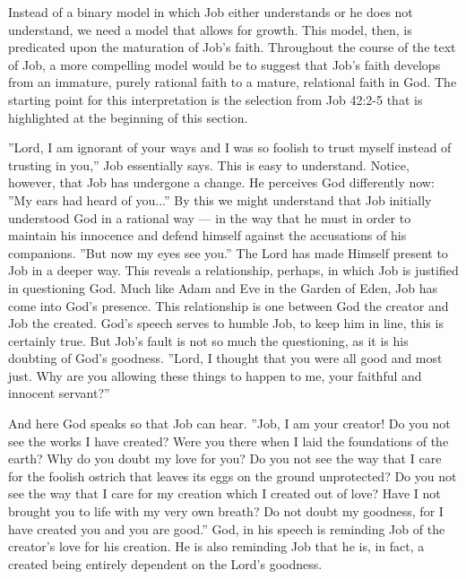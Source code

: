Instead of a binary model in which Job either understands or he does not understand, we need a model that allows for growth. This model, then, is predicated upon the maturation of Job's faith. Throughout the course of the text of Job, a more compelling model would be to suggest that Job's faith develops from an immature, purely rational faith to a mature, relational faith in God. The starting point for this interpretation is the selection from Job 42:2-5 that is highlighted at the beginning of this section.

''Lord, I am ignorant of your ways and I was so foolish to trust myself instead of trusting in you,'' Job essentially says. This is easy to understand. Notice, however, that Job has undergone a change. He perceives God differently now: ''My ears had heard of you...'' By this we might understand that Job initially understood God in a rational way --- in the way that he must in order to maintain his innocence and defend himself against the accusations of his companions. ''But now my eyes see you.'' The Lord has made Himself present to Job in a deeper way. This reveals a relationship, perhaps, in which Job is justified in questioning God. Much like Adam and Eve in the Garden of Eden, Job has come into God's presence. This relationship is one between God the creator and Job the created. God's speech serves to humble Job, to keep him in line, this is certainly true. But Job's fault is not so much the questioning, as it is his doubting of God's goodness. ''Lord, I thought that you were all good and most just. Why are you allowing these things to happen to me, your faithful and innocent servant?''

And here God speaks so that Job can hear. ''Job, I am your creator! Do you not see the works I have created? Were you there when I laid the foundations of the earth? Why do you doubt my love for you? Do you not see the way that I care for the foolish ostrich that leaves its eggs on the ground unprotected? Do you not see the way that I care for my creation which I created out of love? Have I not brought you to life with my very own breath? Do not doubt my goodness, for I have created you and you are good.'' God, in his speech is reminding Job of the creator's love for his creation. He is also reminding Job that he is, in fact, a created being entirely dependent on the Lord's goodness.

